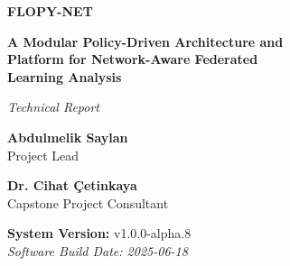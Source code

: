 \documentclass[12pt,twoside,a4paper]{article}
\begin{document}

\begin{titlepage}
\begin{center}
\vspace*{1cm}

{\Huge\bfseries\color{black} FLOPY-NET}

\vspace{1.5cm}

{\LARGE\bfseries A Modular Policy-Driven Architecture and\\ Platform for Network-Aware Federated\\[0.3cm] Learning Analysis}

\vspace{1.5cm}

{\large\textit{Technical Report}}

\vspace{2cm}


\vspace{2cm}

{\large\textbf{Abdulmelik Saylan}}\\
{\normalsize Project Lead}

\vspace{1cm}

{\large\textbf{Dr. Cihat Çetinkaya}}\\
{\normalsize Capstone Project Consultant}

\vspace{1cm}

{\large\textbf{System Version:} v1.0.0-alpha.8}\\
{\normalsize\textit{Software Build Date: 2025-06-18}}\\

\end{center}
\end{titlepage}
\end{document}
